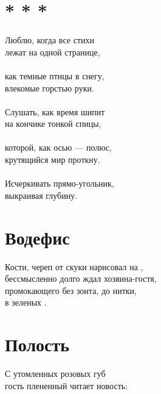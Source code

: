 \documentclass[12pt,a5paper]{report}
\begin{document}
\vspace{3.5cm}




\section[<<Люблю, когда все стихи...>>]{* * *}
Люблю, когда все стихи\\
лежат на одной странице,\\
\\
как темные птицы в снегу,\\
влекомые горстью руки.\\
\\
Слушать, как время шипит\\
на кончике тонкой спицы,\\
\\
которой, как осью --- полюс,\\
крутящийся мир проткну.\\
\\
Исчеркивать прямо-угольник,\\
выкраивая глубину.\\
\newpage



\section{Водефис}
\label{vodefis}
Кости, череп от скуки нарисовал на ,\\
 бессмысленно долго ждал хозяина-гостя,\\
промокающего без зонта, до нитки,\\
в зеленых \hyperref[vodorosli]{}.

\vspace{4cm}




\section{Полость}
С утомленных розовых губ \\
гость плененный читает новость: \\
\end{document}
